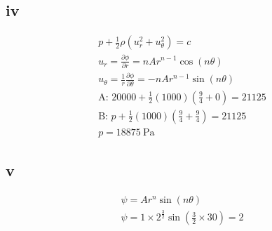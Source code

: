 \documentclass[class=report, crop=false, 12pt,a4paper]{standalone}
\begin{document}
\subsection*{iv}
\begin{gather}
  p + \frac{1}{2} \rho \left( u_r^2 + u_\theta^2 \right) = c\\
  u_r = \frac{\partial \phi}{\partial r} = nAr^{n-1}\cos(n\theta)\\
  u_{\theta} = \frac{1}{r} \frac{\partial \phi}{\partial \theta} = - n A r^{n-1} \sin(n \theta)\\
  \textrm{A: } 20000 + \frac{1}{2}(1000)\left(\frac{9}{4} + 0\right) = 21125\\
  \textrm{B: }p + \frac{1}{2}(1000)\left(\frac{9}{4} + \frac{9}{4}\right) = 21125\\
  p = 18875 \ \si{\pascal}
\end{gather}
\subsection*{v}
\begin{gather}
  \psi = Ar^n \sin(n\theta)\\
  \psi = 1\times 2^{\frac{3}{2}} \sin(\frac{3}{2}\times 30) =2\\
\end{gather}
\end{document}
